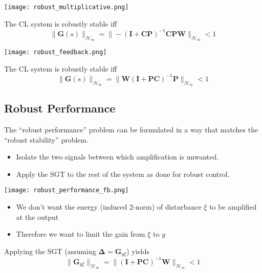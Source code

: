 \begin{center}
    \texttt{[image: robust\_multiplicative.png]}
\end{center}
The CL system is robustly stable iff
\begin{equation*}
    \|\mathbf{G}(s)\|_{\mathcal{H}_\infty}=\|-{(\mathbf{I}+\mathbf{CP})}^{-1}\mathbf{CPW}\|_{\mathcal{H}_\infty}<1
\end{equation*}

\begin{center}
    \texttt{[image: robust\_feedback.png]}
\end{center}
The CL system is robustly stable iff
\begin{equation*}
    \|\mathbf{G}(s)\|_{\mathcal{H}_\infty}=\|\mathbf{W}{(\mathbf{I}+\mathbf{PC})}^{-1}\mathbf{P}\|_{\mathcal{H}_\infty}<1
\end{equation*}

\subsection{Robust Performance}
The “robust performance” problem can be formulated in a way that matches the “robust stability” problem.
\begin{itemize}
    \item Isolate the two signals between which amplification is unwanted.
    \item Apply the SGT to the rest of the system as done for robust control.
\end{itemize}


\begin{center}
    \texttt{[image: robust\_performance\_fb.png]}
\end{center}
\begin{itemize}
    \item We don't want the energy (induced 2-norm) of disturbance $\xi$ to be amplified at the output
    \item Therefore we want to limit the gain from $\xi$ to $y$
\end{itemize}

Applying the SGT (assuming $\boldsymbol{\Delta}=\mathbf{G}_{y\xi}$) yields
\begin{equation*}
    \|\mathbf{G}_{y\xi}\|_{\mathcal{H}_\infty}=\|{(\mathbf{I}+\mathbf{PC})}^{-1}\mathbf{W}\|_{\mathcal{H}_\infty}<1
\end{equation*}

